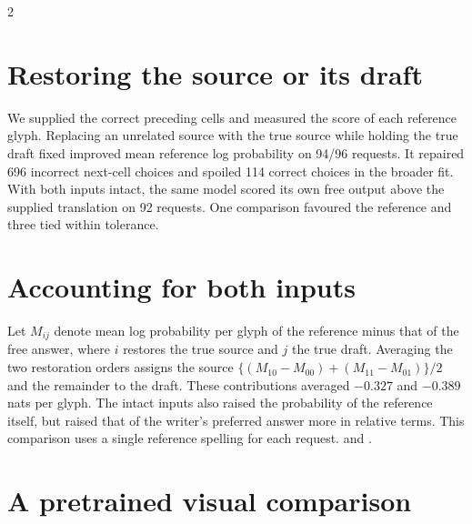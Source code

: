 \begin{multicols}{2}
\section*{Restoring the source or its draft}
We supplied the correct preceding cells and measured the score of each reference glyph. Replacing an unrelated source with the true source while holding the true draft fixed improved mean reference log probability on 94/96 requests. It repaired 696 incorrect next-cell choices and spoiled 114 correct choices in the broader fit. With both inputs intact, the same model scored its own free output above the supplied translation on 92 requests. One comparison favoured the reference and three tied within tolerance.
\section*{Accounting for both inputs}
Let $M_{ij}$ denote mean log probability per glyph of the reference minus that of the free answer, where $i$ restores the true source and $j$ the true draft. Averaging the two restoration orders assigns the source
$\{(M_{10}-M_{00})+(M_{11}-M_{01})\}/2$ and the remainder to the draft. These contributions averaged $-0.327$ and $-0.389$ nats per glyph. The intact inputs also raised the probability of the reference itself, but raised that of the writer's preferred answer more in relative terms. This comparison uses a single reference spelling for each request.  and .
\section*{A pretrained visual comparison}

\end{multicols}
